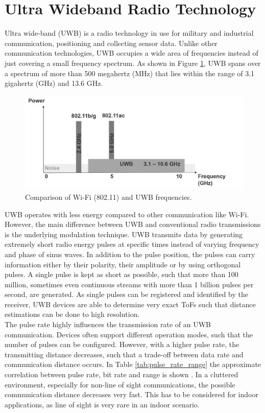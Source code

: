 \section{Ultra Wideband Radio Technology}
Ultra wide-band (UWB) is a radio technology in use for military and industrial communication, positioning and collecting sensor data. Unlike other communication technologies, UWB occupies a wide area of frequencies instead of just covering a small frequency spectrum. As shown in Figure \ref{fig:frequency_spectrum}, UWB spans over a spectrum of more than 500 megahertz (MHz) that lies within the range of 3.1 gigahertz (GHz) and 13.6 GHz.
\begin{figure}[th]
\centering
\includegraphics[width=1.0\textwidth]{Figures/frequency_spectrum}
\decoRule
\caption[UWB Frequency Spectrum]{Comparison of Wi-Fi (802.11) and UWB frequencies.}
\label{fig:frequency_spectrum}
\end{figure}
UWB operates with less energy compared to other communication like Wi-Fi. However, the main difference between UWB and conventional radio transmissions is the underlying modulation technique. UWB transmits data by generating extremely short radio energy pulses at specific times instead of varying frequency and phase of sinus waves. In addition to the pulse position, the pulses can carry information either by their polarity, their amplitude or by using orthogonal pulses.
A single pulse is kept as short as possible, such that more than 100 million, sometimes even continuous streams with more than 1 billion pulses per second, are generated. As single pulses can be registered and identified by the receiver, UWB devices are able to determine very exact ToFs such that distance estimations can be done to high resolution.\\
\noindent\hspace*{5mm}%
The pulse rate highly influences the transmission rate of an UWB communication. Devices often support different operation modes, such that the number of pulses can be configured. However, with a higher pulse rate, the transmitting distance decreases, such that a trade-off between data rate and communication distance occurs. In Table \ref{tab:pulse_rate_range} the approximate correlation between pulse rate, bit rate and range is shown \cite{ITU}. In a cluttered environment, especially for non-line of sight communications, the possible communication distance decreases very fast. This has to be considered for indoor applications, as line of sight is very rare in an indoor scenario.

